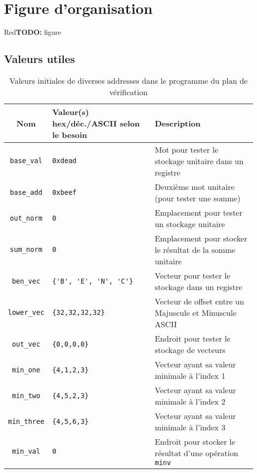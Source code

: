 \documentclass[a11paper]{article}
\newcommand{\todo}[1]{\begin{color}{Red}\textbf{TODO:} #1\end{color}}
\begin{document}
\section{Figure d'organisation}

\todo{figure}

\begin{appendices}
\section{Valeurs utiles}

\begin{table}[H]
	\centering
	\footnotesize
	\caption{Valeurs initiales de diverses addresses dans le programme du plan de vérification}
	\label{tab:data}
	\begin{tabular}{@{}cp{5.5cm}l@{}}
		\toprule
    \textbf{Nom} &
    \textbf{Valeur(s)} hex/déc./ASCII selon le besoin &
    \textbf{Description} \\
		\midrule

    \verb|base_val|  & \verb|0xdead|               & Mot pour tester le stockage unitaire dans un registre        \\
    \verb|base_add|  & \verb|0xbeef|               & Deuxième mot unitaire (pour tester une somme)                \\
		\verb|out_norm|  & \verb|0|                    & Emplacement pour tester un stockage unitaire                 \\
		\verb|sum_norm|  & \verb|0|                    & Emplacement pour stocker le résultat de la somme unitaire    \\
		\verb|ben_vec|   & \verb|{'B', 'E', 'N', 'C'}| & Vecteur pour tester le stockage dans un registre             \\
		\verb|lower_vec| & \verb|{32,32,32,32}|        & Vecteur de offset entre un Majuscule et Minuscule ASCII      \\
		\verb|out_vec|   & \verb|{0,0,0,0}|            & Endroit pour tester le stockage de vecteurs                  \\
    \verb|min_one|   & \verb|{4,1,2,3}|            & Vecteur ayant sa valeur minimale à l'index 1 \\
    \verb|min_two|   & \verb|{4,5,2,3}|            & Vecteur ayant sa valeur minimale à l'index 2 \\
    \verb|min_three| & \verb|{4,5,6,3}|            & Vecteur ayant sa valeur minimale à l'index 3 \\
		\verb|min_val|   & \verb|0|                    & Endroit pour stocker le résultat d'une opération \verb|minv| \\


\end{tabular}
\end{table}
\end{appendices}
\end{document}
